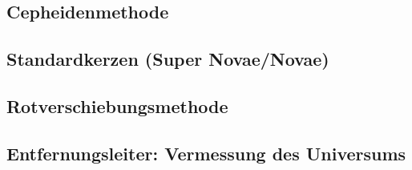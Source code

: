 \subsection{Cepheidenmethode}
\subsection[Standardkerzen]{Standardkerzen (Super Novae/Novae)}
\subsection{Rotverschiebungsmethode}
\subsection{Entfernungsleiter: Vermessung des Universums}
